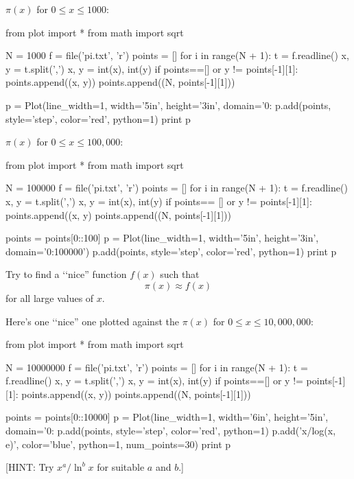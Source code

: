 $\pi(x)$ for $0 \leq x \leq 1000$:
\begin{python}
from plot import *
from math import sqrt

N = 1000
f = file('pi.txt', 'r')
points = []
for i in range(N + 1):
    t = f.readline()
    x, y = t.split(',')
    x, y = int(x), int(y)
    if points==[] or y != points[-1][1]:
        points.append((x, y))
points.append((N, points[-1][1]))

p = Plot(line_width=1, width='5in', height='3in', domain='0:%
p.add(points, style='step', color='red', python=1)
print p
\end{python}



$\pi(x)$ for $0 \leq x \leq 100,000$:
\begin{python}
from plot import *
from math import sqrt

N = 100000
f = file('pi.txt', 'r')
points = []
for i in range(N + 1):
    t = f.readline()
    x, y = t.split(',')
    x, y = int(x), int(y)
    if points== [] or y != points[-1][1]:
        points.append((x, y)
points.append((N, points[-1][1]))

points = points[0::100]
p = Plot(line_width=1, width='5in', height='3in', domain='0:100000')
p.add(points, style='step', color='red', python=1)
print p
\end{python}



\begin{ex}
Try to find a \lq\lq nice'' function $f(x)$ such that 
\[
\pi(x) \approx f(x)
\]
for all large values of $x$.
\end{ex}

Here's one \lq\lq nice'' one plotted against the $\pi(x)$ 
for $0 \leq x \leq 10,000,000$:
\begin{python}
from plot import *
from math import sqrt

N = 10000000
f = file('pi.txt', 'r')
points = []
for i in range(N + 1):
    t = f.readline()
    x, y = t.split(',')
    x, y = int(x), int(y)
    if points==[] or y != points[-1][1]:
        points.append((x, y))
points.append((N, points[-1][1]))

points = points[0::10000]
p = Plot(line_width=1, width='6in', height='5in', domain='0:%
p.add(points, style='step', color='red', python=1)
p.add('x/log(x, e)', color='blue', python=1, num_points=30)
print p
\end{python}
[HINT: Try $x^a /\ln^b x$ for suitable $a$ and $b$.]

